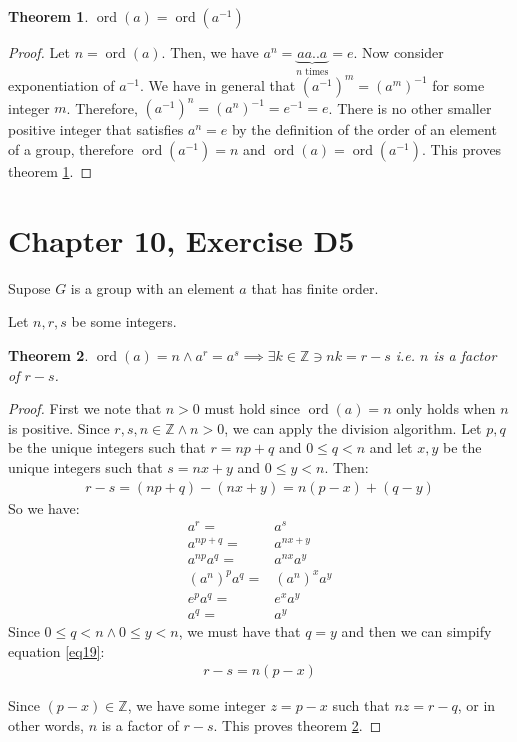\documentclass[12pt]{article}
\newcommand{\ints}{\mathbb{Z}}
\newcommand{\ord}{\operatorname{ord}}
\newtheorem{thm}{Theorem}
\begin{document}
\begin{thm} \label{thm9}
	$\ord(a) = \ord(a^{-1})$
\end{thm}

\begin{proof}
	Let $n = \ord(a)$.
	Then, we have $a^n = \underbrace{aa ..a}_{\text{$n$ times}} = e$.
	Now consider exponentiation of $a^{-1}$.
	We have in general that $(a^{-1})^m = (a^m)^{-1}$ for some integer $m$.
	Therefore, $(a^{-1})^n = (a^n)^{-1} = e^{-1} = e$.
	There is no other smaller positive integer that satisfies $a^n = e$
	by the definition of the order of an element of a group,
	therefore $\ord(a^{-1}) = n$ and $\ord(a) = \ord(a^{-1})$.
	This proves theorem \ref{thm9}.
\end{proof}

\section{Chapter 10, Exercise D5}

Supose $G$ is a group with an element $a$ that has finite order.

Let $n,r,s$ be some integers.

\begin{thm} \label{thm10}
	$\ord(a) = n \land a^r = a^s \implies \exists k \in \ints \ni nk = r-s$
	i.e. $n$ is a factor of $r - s$.
\end{thm}

\begin{proof}
	First we note that $n > 0$ must hold since $\ord(a) = n$
	only holds when $n$ is positive.
	Since $r,s,n \in \ints \land n > 0$,
	we can apply the division algorithm.
	Let $p,q$ be the unique integers such that $r = np + q$ and $0 \le q < n$ and
	let $x,y$ be the unique integers such that $s = nx + y$ and $0 \le y < n$.
	Then:
	\begin{align} \label{eq19}
		r - s = (np + q) - (nx + y) = n(p - x) + (q - y)
	\end{align}
	So we have:
	\begin{align*}
		a^r = & a^s \\
		a^{np + q} = & a^{nx + y} \\
		a^{np}a^q = & a^{nx}a^y \\
		(a^n)^pa^q = & (a^n)^x a^y \\
		e^p a^q = & e^x a^y \\
		a^q = & a^y
	\end{align*}
	Since $0 \le q < n \land 0 \le y < n$,
	we must have that $q = y$ and then we can simpify equation \ref{eq19}:
	\begin{align} \label{eq20}
		r - s = n(p - x)
	\end{align}

	Since $(p - x) \in \ints$, we have some integer $z = p - x$ such that
	$nz = r - q$, or in other words,
	$n$ is a factor of $r - s$.
	This proves theorem \ref{thm10}.
\end{proof}
\end{document}
